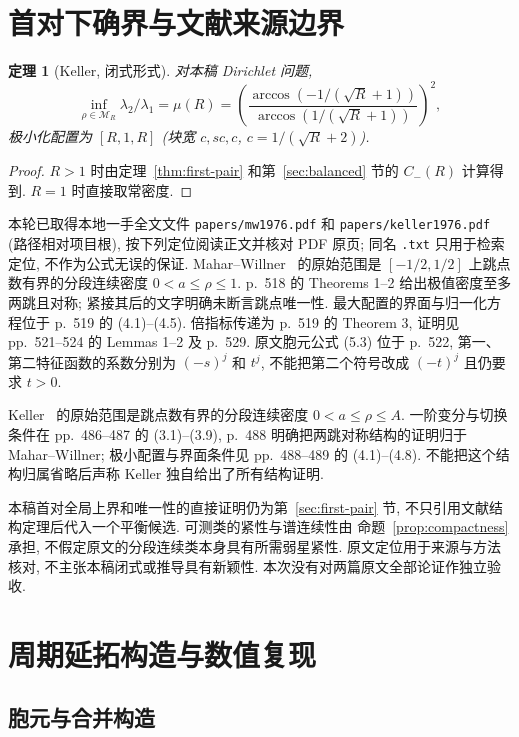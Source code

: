 \documentclass[UTF8]{ctexart}
\newtheorem{theorem}{定理}[section]
\begin{document}
\section{首对下确界与文献来源边界}

\begin{theorem}[Keller, 闭式形式]
对本稿 Dirichlet 问题,
\[
 \inf_{\rho\in\mathcal M_R}\lambda_2/\lambda_1=\mu(R)
 =\left(\frac{\arccos(-1/(\sqrt R+1))}{\arccos(1/(\sqrt R+1))}\right)^2,
\]
极小化配置为 $[R, 1, R]$ (块宽 $c, sc, c$, $c = 1/(\sqrt{R}+2)$).
\end{theorem}

\begin{proof}
$R>1$ 时由定理~\ref{thm:first-pair} 和第~\ref{sec:balanced} 节的 $C_-(R)$ 计算得到.
$R=1$ 时直接取常密度.
\end{proof}

本轮已取得本地一手全文文件 \texttt{papers/mw1976.pdf} 和
\texttt{papers/keller1976.pdf} (路径相对项目根), 按下列定位阅读正文并核对 PDF 原页;
同名 \texttt{.txt} 只用于检索定位, 不作为公式无误的保证.
Mahar--Willner~\cite[pp.~517--518, Sections 1--3]{mw} 的原始范围是
$[-1/2,1/2]$ 上跳点数有界的分段连续密度 $0<a\leq\rho\leq1$.
p.~518 的 Theorems 1--2 给出极值密度至多两跳且对称;
紧接其后的文字明确未断言跳点唯一性.
最大配置的界面与归一化方程位于 p.~519 的 (4.1)--(4.5).
倍指标传递为 p.~519 的 Theorem 3, 证明见 pp.~521--524 的 Lemmas 1--2
及 p.~529. 原文胞元公式 (5.3) 位于 p.~522, 第一、第二特征函数的系数分别为
$(-s)^j$ 和 $t^j$, 不能把第二个符号改成 $(-t)^j$ 且仍要求 $t>0$.

Keller~\cite[p.~485, (1.1)--(2.1)]{keller} 的原始范围是跳点数有界的分段连续密度
$0<a\leq\rho\leq A$. 一阶变分与切换条件在 pp.~486--487 的 (3.1)--(3.9),
p.~488 明确把两跳对称结构的证明归于 Mahar--Willner;
极小配置与界面条件见 pp.~488--489 的 (4.1)--(4.8).
不能把这个结构归属省略后声称 Keller 独自给出了所有结构证明.

本稿首对全局上界和唯一性的直接证明仍为第~\ref{sec:first-pair} 节,
不只引用文献结构定理后代入一个平衡候选. 可测类的紧性与谱连续性由
命题~\ref{prop:compactness} 承担, 不假定原文的分段连续类本身具有所需弱星紧性.
原文定位用于来源与方法核对, 不主张本稿闭式或推导具有新颖性.
本次没有对两篇原文全部论证作独立验收.

\section{周期延拓构造与数值复现}

\subsection{胞元与合并构造}
\end{document}
